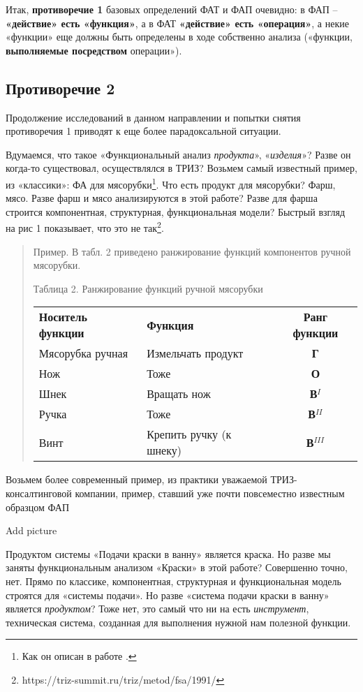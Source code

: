 \documentclass[11pt,a4paper]{article}
\begin{document}
Итак, \textbf{противоречие 1} базовых определений ФАТ и ФАП очевидно: в ФАП –
\textbf{«действие» есть «функция»}, а в ФАТ \textbf{«действие» есть
  «операция»}, а некие «функции» еще должны быть определены в ходе собственно
анализа («функции, \textbf{выполняемые посредством} операции»).

\subsection{Противоречие 2}
Продолжение исследований в данном направлении и попытки снятия противоречия 1
приводят к еще более парадоксальной ситуации.

Вдумаемся, что такое «Функциональный анализ \emph{продукта}»,
«\emph{изделия}»? Разве он когда-то существовал, осуществлялся в ТРИЗ? Возьмем
самый известный пример, из «классики»: ФА для мясорубки\footnote{Как он описан
  в работе \cite{Gerasimov1991}.}. Что есть продукт для мясорубки? Фарш, мясо.
Разве фарш и мясо анализируются в этой работе?  Разве для фарша строится
компонентная, структурная, функциональная модели?  Быстрый взгляд на рис 1
показывает, что это не
так\footnote{https://triz-summit.ru/triz/metod/fsa/1991/}. 
\begin{quote}
Пример. В табл. 2 приведено ранжирование функций компонентов ручной мясорубки.

Таблица 2. Ранжирование функций ручной мясорубки

\begin{tabular}{p{4.5cm}p{4.5cm}c}
\textbf{Носитель функции} & \textbf{Функция} & \textbf{Ранг функции}\\
Мясорубка ручная & Измельчать продукт & \textbf{Г} \\
Нож & Тоже & \textbf{О}\\
Шнек & Вращать нож & \textbf{В$^I$}\\
Ручка & Тоже & \textbf{В$^{II}$}\\
Винт & Крепить ручку (к шнеку) & \textbf{В$^{III}$}
\end{tabular}
\end{quote}
Возьмем более современный пример, из практики уважаемой ТРИЗ-консалтинговой
компании, пример, ставший уже почти повсеместно известным образцом ФАП
\begin{center}
  Add picture
\end{center}
Продуктом системы «Подачи краски в ванну» является краска. Но разве мы заняты
функциональным анализом «Краски» в этой работе? Совершенно точно, нет. Прямо
по классике, компонентная, структурная и функциональная модель строятся для
«системы подачи». Но разве «система подачи краски в ванну» является
\emph{продуктом}? Тоже нет, это самый что ни на есть \emph{инструмент},
техническая система, созданная для выполнения нужной нам полезной функции.
\end{document}
